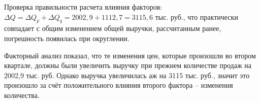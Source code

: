\documentclass[fleqn]{article}
\begin{document}
Проверка правильности расчета влияния факторов: $\Delta Q =\Delta Q_p+\Delta Q_q =2002,9+1112,7= 3115,6$ тыс. руб., что практически совпадает с общим изменением общей выручки, рассчитанным ранее, погрешность появилась при округлении.


Факторный анализ показал, что те изменения цен, которые произошли во втором квартале, должны были увеличить выручку при прежнем количестве продаж на 2002,9 тыс. руб. Однако выручка увеличилась аж на 3115 тыс. руб., значит это произошло за счёт положительного влияния второго фактора -- изменения количества.

\begin{comment}
$$\Delta Q_p=\sum{q_1(p_1-p_0)}=\sum{q_1p_1}-\sum{q_1p_0}=50265-(198\cdot130+264\cdot50+511\cdot20)=50265-49160=1105$$

$$\Delta Q_q=\sum{p_0(q_1-q_0)}=\sum{p_0q_1}-\sum{p_0q_0}=49160-47150=2010$$
\end{comment}
\end{document}
